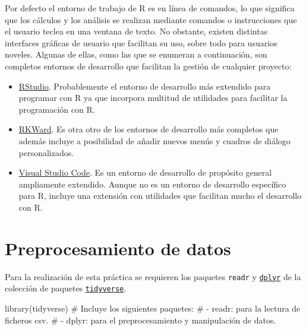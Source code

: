 \documentclass[
  a4paper,
]{scrreport}
\newenvironment{Shaded}{\begin{snugshade}}{\end{snugshade}}
\newcommand{\CommentTok}[1]{\textcolor[rgb]{0.37,0.37,0.37}{#1}}
\newcommand{\FunctionTok}[1]{\textcolor[rgb]{0.28,0.35,0.67}{#1}}
\newcommand{\NormalTok}[1]{\textcolor[rgb]{0.00,0.23,0.31}{#1}}
\theoremstyle{definition}
\theoremstyle{remark}
\begin{document}
Por defecto el entorno de trabajo de R es en línea de comandos, lo que
significa que los cálculos y los análisis se realizan mediante comandos
o instrucciones que el usuario teclea en una ventana de texto. No
obstante, existen distintas interfaces gráficas de usuario que facilitan
su uso, sobre todo para usuarios noveles. Algunas de ellas, como las que
se enumeran a continuación, son completos entornos de desarrollo que
facilitan la gestión de cualquier proyecto:

\begin{itemize}
\item
  \href{https://www.rstudio.com/}{RStudio}. Probablemente el entorno de
  desarrollo más extendido para programar con R ya que incorpora
  multitud de utilidades para facilitar la programación con R.
\item
  \href{https://rkward.kde.org}{RKWard}. Es otra otro de los entornos de
  desarrollo más completos que además incluye a posibilidad de añadir
  nuevos menús y cuadros de diálogo personalizados.
\item
  \href{https://code.visualstudio.com/}{Visual Studio Code}. Es un
  entorno de desarrollo de propósito general ampliamente extendido.
  Aunque no es un entorno de desarrollo específico para R, incluye una
  extensión con utilidades que facilitan mucho el desarrollo con R.
\end{itemize}


\hypertarget{preprocesamiento-de-datos}{%
\chapter{Preprocesamiento de datos}\label{preprocesamiento-de-datos}}

Para la realización de esta práctica se requieren los paquetes
\texttt{readr} y
\href{https://aprendeconalf.es/manual-r/06-preprocesamiento.html\#el-paquete-dplyr}{\texttt{dplyr}}
de la colección de paquetes
\href{https://aprendeconalf.es/manual-r/06-preprocesamiento.html\#la-colecci\%C3\%B3n-de-paquetes-tidyverse}{\texttt{tidyverse}}.

\begin{Shaded}
\begin{Highlighting}[]
\FunctionTok{library}\NormalTok{(tidyverse) }
\CommentTok{\# Incluye los siguientes paquetes:}
\CommentTok{\# {-} readr: para la lectura de ficheros csv. }
\CommentTok{\# {-} dplyr: para el preprocesamiento y manipulación de datos.}
\end{Highlighting}
\end{Shaded}
\end{document}
